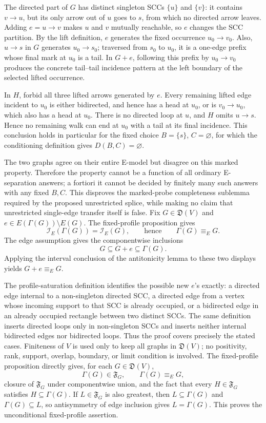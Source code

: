 The directed part of \(G\) has distinct singleton SCCs \(\{u\}\) and \(\{v\}\): it contains \(v\to u\), but its only arrow out of \(u\) goes to \(s\), from which no directed arrow leaves.  Adding \(e=u\to v\) makes \(u\) and \(v\) mutually reachable, so \(e\) changes the SCC partition.  By the lift definition, \(e\) generates the fixed occurrence \(u_0\to v_0\).  Also, \(u\to s\) in \(G\) generates \(u_0\to s_0\); traversed from \(s_0\) to \(u_0\), it is a one-edge prefix whose final mark at \(u_0\) is a tail.  In \(G+e\), following this prefix by \(u_0\to v_0\) produces the concrete tail--tail incidence pattern at the left boundary of the selected lifted occurrence.

In \(H\), forbid all three lifted arrows generated by \(e\).  Every remaining lifted edge incident to \(u_0\) is either bidirected, and hence has a head at \(u_0\), or is \(v_0\to u_0\), which also has a head at \(u_0\).  There is no directed loop at \(u\), and \(H\) omits \(u\to s\).  Hence no remaining walk can end at \(u_0\) with a tail at its final incidence.  This conclusion holds in particular for the fixed choice \(B=\{s\}\), \(C=\varnothing\), for which the conditioning definition gives \(D(B,C)=\varnothing\).

The two graphs agree on their entire E-model but disagree on this marked property.  Therefore the property cannot be a function of all ordinary E-separation answers; a fortiori it cannot be decided by finitely many such answers with any fixed \(B,C\).  This disproves the marked-probe completeness sublemma required by the proposed unrestricted splice, while making no claim that unrestricted single-edge transfer itself is false.
Fix \(G\in\mathfrak D(V)\) and \(e\in E(\Gamma(G))\setminus E(G)\).  The fixed-profile proposition gives
\[
 \mathcal I_E(\Gamma(G))=\mathcal I_E(G),
 \qquad\text{hence}\qquad \Gamma(G)\equiv_EG.
\]
The edge assumption gives the componentwise inclusions
\[
 G\subseteq G+e\subseteq\Gamma(G).
\]
Applying the interval conclusion of the antitonicity lemma to these two displays yields \(G+e\equiv_EG\).

The profile-saturation definition identifies the possible new \(e\)'s exactly: a directed edge internal to a non-singleton directed SCC, a directed edge from a vertex whose incoming support to that SCC is already occupied, or a bidirected edge in an already occupied rectangle between two distinct SCCs.  The same definition inserts directed loops only in non-singleton SCCs and inserts neither internal bidirected edges nor bidirected loops.  Thus the proof covers precisely the stated cases.  Finiteness of \(V\) is used only to keep all graphs in \(\mathfrak D(V)\); no positivity, rank, support, overlap, boundary, or limit condition is involved.
The fixed-profile proposition directly gives, for each \(G\in\mathfrak D(V)\),
\[
 \Gamma(G)\in\mathfrak F_G,
 \qquad \Gamma(G)\equiv_EG,
\]
closure of \(\mathfrak F_G\) under componentwise union, and the fact that every \(H\in\mathfrak F_G\) satisfies \(H\subseteq\Gamma(G)\).  If \(L\in\mathfrak F_G\) is also greatest, then \(L\subseteq\Gamma(G)\) and \(\Gamma(G)\subseteq L\), so antisymmetry of edge inclusion gives \(L=\Gamma(G)\).  This proves the unconditional fixed-profile assertion.

